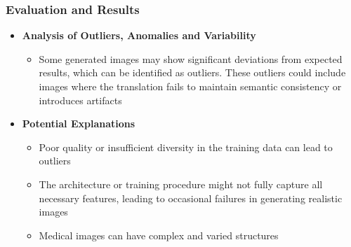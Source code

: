 \documentclass[aspectratio=169, lecture, amberg]{OTHAWbeamer}
\begin{document}
\begin{frame}
    \frametitle{Evaluation and Results}
    \begin{itemize}
        \item <1-> \textbf{Analysis of Outliers, Anomalies and Variability }
        \vspace{0.2cm}
        \begin{itemize}
            
            \item Some generated images may show significant deviations from expected results, which can be identified as outliers. These outliers could include images where the translation fails to maintain semantic consistency or introduces artifacts
            \vspace{0.2cm}
        \end{itemize}
        \item <2-> \textbf{Potential Explanations}
        \vspace{0.2cm}
        \begin{itemize}
            \item Poor quality or insufficient diversity in the training data can lead to outliers
            \vspace{0.2cm}
            \item The architecture or training procedure might not fully capture all necessary features, leading to occasional failures in generating realistic images
            \vspace{0.2cm}
            \item Medical images can have complex and varied structures
        \end{itemize}
    \end{itemize}
    
\end{frame}
\end{document}
